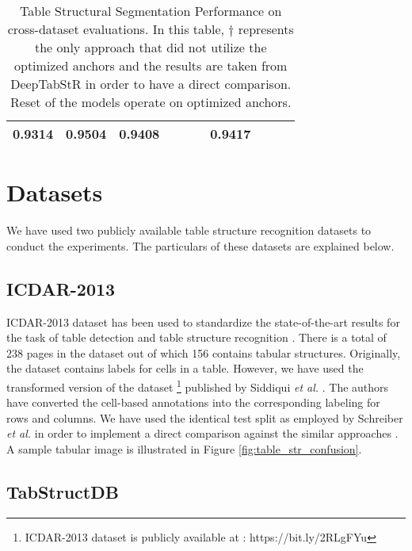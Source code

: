 \documentclass{ieeeaccess}
\begin{document}
\begin{table*}
\begin{tabularx}{\linewidth}{|u|u|t|v|v|k|v|v|k|k|}
        \footnotesize \centering \textbf{0.9314}&
        \footnotesize \centering \textbf{0.9504}&
        \footnotesize \centering \textbf{0.9408}&
        \footnotesize {}&
        \footnotesize {}&
        \footnotesize {}&
        \footnotesize 
        \textbf{0.9417} \\
        \hline


\end{tabularx}
    \caption{Table Structural Segmentation Performance on cross-dataset evaluations. In this table, $\dagger$ represents the only approach that did not utilize the optimized anchors and the results are taken from DeepTabStR \cite{b33} in order to have a direct comparison. Reset of the models operate on optimized anchors. }
    \label{tab:cross_dataset}
\end{table*} 




\section{Datasets}
\label{sec:datasets}
We have used two publicly available table structure recognition datasets to conduct the experiments. The particulars of these datasets are explained below.

\subsection{ICDAR-2013}

ICDAR-2013 \cite{b18} dataset has been used to standardize the state-of-the-art results for the task of table detection and table structure recognition \cite{b27, b32}. There is a total of 238 pages in the dataset out of which 156 contains tabular structures. Originally, the dataset contains labels for cells in a table. However, we have used the transformed version of the dataset \footnote{ICDAR-2013 dataset is publicly available at : https://bit.ly/2RLgFYu} published by Siddiqui \textit{et al.} \cite{b32}. The authors have converted the cell-based annotations into the corresponding labeling for rows and columns. We have used the identical test split as employed by Schreiber \textit{et al.} \cite{b27} in order to implement a direct comparison against the similar approaches \cite{b27,b32,b33}. A sample tabular image is illustrated in Figure \ref{fig:table_str_confusion}.

\subsection{TabStructDB}
\end{document}
